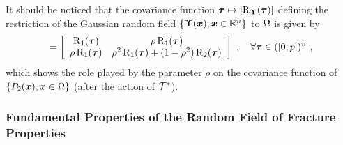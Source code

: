 It should be noticed that the covariance function $\boldsymbol{\tau} \mapsto [\operatorname{R}_{\boldsymbol{\Upsilon}}(\boldsymbol{\tau})]$ defining the restriction of the Gaussian random field $\{\boldsymbol{\Upsilon}(\boldsymbol{x}), \boldsymbol{x} \in \mathbb{R}^n\}$ to $\Omega$ is given by
\begin{align}
  [\cor_{\bs{\Upsilon}}(\bs{\tau})] = \left[\begin{array}{cc}\cor_1(\bs{\tau}) & \rho \cor_1(\bs{\tau}) \\\rho \cor_1(\bs{\tau}) & \rho^2 \cor_1(\bs{\tau}) + (1-\rho^2) \cor_2(\bs{\tau}) \end{array}\right]~, \quad \forall \bs{\tau} \in ([0,p])^n~,
\end{align}
which shows the role played by the parameter $\rho$ on the covariance function of $\{P_2(\boldsymbol{x}), \boldsymbol{x} \in \Omega\}$ (after the action of $\mathcal{T}^*$).

\subsubsection{Fundamental Properties of the Random Field of Fracture Properties}

